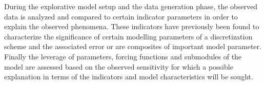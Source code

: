 During the explorative model setup and the data generation phase, the
observed data is analyzed and compared to certain indicator parameters
in order to explain the observed phenomena. These indicators have
previously been found to characterize the significance of certain
modelling parameters \autocite{Shin2004} of a discretization scheme and
the associated error or are composites of important model parameter.
Finally the leverage of parameters, forcing functions and submodules of
the model are assessed based on the observed sensitivity for which a
possible explanation in terms of the indicators and model
characteristics will be sought.
